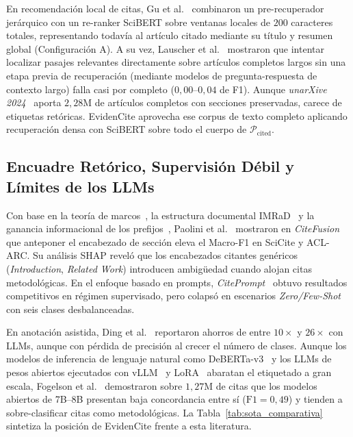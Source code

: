 \documentclass[conference]{IEEEtran}
\begin{document}
En recomendación local de citas, Gu et al.~\cite{gu2022local} combinaron un pre-recuperador jerárquico con un re-ranker SciBERT sobre ventanas locales de $200$ caracteres totales, representando todavía al artículo citado mediante su título y resumen global (Configuración A). A su vez, Lauscher et al.~\cite{lauscher2022multicite} mostraron que intentar localizar pasajes relevantes directamente sobre artículos completos largos sin una etapa previa de recuperación (mediante modelos de pregunta-respuesta de contexto largo) falla casi por completo ($0,00\text{--}0,04$ de F1). Aunque \textit{unarXive 2024}~\cite{besrour2026unarxive} aporta $2,28\text{M}$ de artículos completos con secciones preservadas, carece de etiquetas retóricas. EvidenCite aprovecha ese corpus de texto completo aplicando recuperación densa con SciBERT sobre todo el cuerpo de $\mathcal{P}_{\text{cited}}$.

\subsection{Encuadre Retórico, Supervisión Débil y Límites de los LLMs}

Con base en la teoría de marcos~\cite{goffman1974frame}, la estructura documental \mbox{IMRaD}~\cite{bertin2014study} y la ganancia informacional de los prefijos~\cite{pimentel2021disambiguatory}, Paolini et al.~\cite{paolini2025citefusion} mostraron en \textit{CiteFusion} que anteponer el encabezado de sección eleva el Macro-F1 en SciCite y ACL-ARC. Su análisis SHAP reveló que los encabezados citantes genéricos (\textit{Introduction}, \textit{Related Work}) introducen ambigüedad cuando alojan citas metodológicas. En el enfoque basado en prompts, \textit{CitePrompt}~\cite{lahiri2023citeprompt} obtuvo resultados competitivos en régimen supervisado, pero colapsó en escenarios \textit{Zero/Few-Shot} con seis clases desbalanceadas.

En anotación asistida, Ding et al.~\cite{ding2023gpt3} reportaron ahorros de entre $10\times$ y $26\times$ con LLMs, aunque con pérdida de precisión al crecer el número de clases. Aunque los modelos de inferencia de lenguaje natural como DeBERTa-v3~\cite{he2023debertav3} y los LLMs de pesos abiertos ejecutados con vLLM~\cite{kwon2023efficient} y LoRA~\cite{hu2022lora} abaratan el etiquetado a gran escala, Fogelson et al.~\cite{fogelson2025llms} demostraron sobre $1,27\text{M}$ de citas que los modelos abiertos de 7B--8B presentan baja concordancia entre sí ($\text{F1}=0,49$) y tienden a sobre-clasificar citas como metodológicas. La Tabla~\ref{tab:sota_comparativa} sintetiza la posición de EvidenCite frente a esta literatura.
\end{document}
